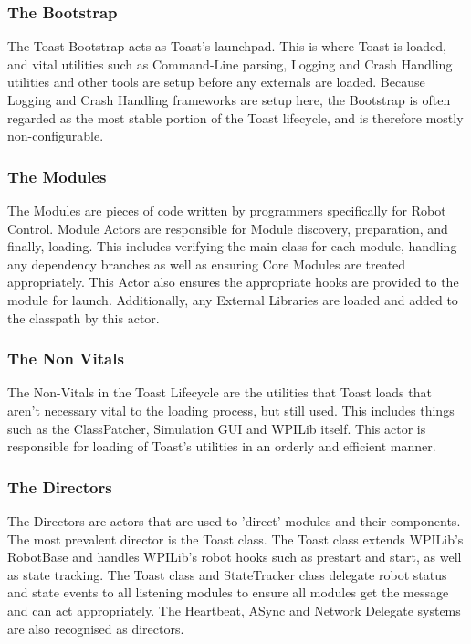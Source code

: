 \documentclass[a4paper,12pt]{article}
\begin{document}
\subsubsection{The Bootstrap}
The Toast Bootstrap acts as Toast's launchpad. This is where Toast is loaded, and vital utilities such as Command-Line parsing, Logging and Crash Handling utilities and other tools are setup before any externals are loaded. Because Logging and Crash Handling frameworks are setup here, the Bootstrap is often regarded as the most stable portion of the Toast lifecycle, and is therefore mostly non-configurable.  

\subsubsection{The Modules}
The Modules are pieces of code written by programmers specifically for Robot Control. Module Actors are responsible for Module discovery, preparation, and finally, loading. This includes verifying the main class for each module, handling any dependency branches as well as ensuring Core Modules are treated appropriately. This Actor also ensures the appropriate hooks are provided to the module for launch. Additionally, any External Libraries are loaded and added to the classpath by this actor.

\subsubsection{The Non Vitals}
The Non-Vitals in the Toast Lifecycle are the utilities that Toast loads that aren't necessary vital to the loading process, but still used. This includes things such as the ClassPatcher, Simulation GUI and WPILib itself. This actor is responsible for loading of Toast's utilities in an orderly and efficient manner.

\subsubsection{The Directors}
The Directors are actors that are used to 'direct' modules and their components. The most prevalent director is the Toast class. The Toast class extends WPILib's RobotBase and handles WPILib's robot hooks such as prestart and start, as well as state tracking. The Toast class and StateTracker class delegate robot status and state events to all listening modules to ensure all modules get the message and can act appropriately. The Heartbeat, ASync and Network Delegate systems are also recognised as directors.
\end{document}
